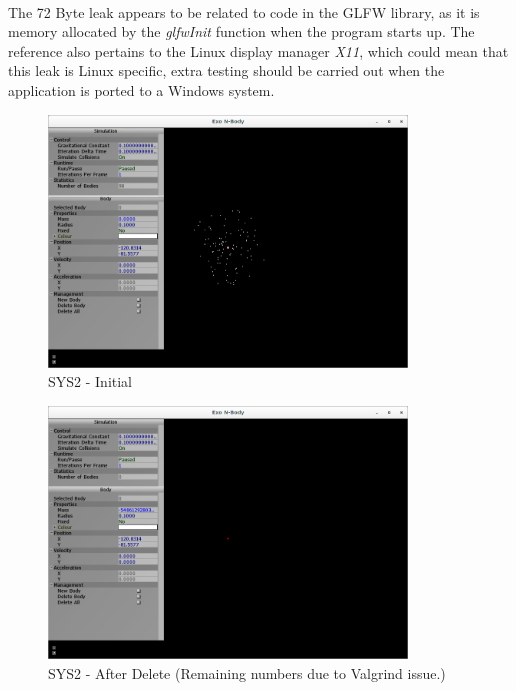 \paragraph{}
The 72 Byte leak appears to be related to code in the GLFW library, as it is memory allocated by the \textit{glfwInit} function when the program starts up. The reference also pertains to the Linux display manager \textit{X11}, which could mean that this leak is Linux specific, extra testing should be carried out when the application is ported to a Windows system.

\pagebreak





\pagebreak

\begin{figure}[H]
  \centering
  \includegraphics[width=0.85\textwidth]{img/testingEvidence/sys2_0.png}
  \caption{SYS2 - Initial}
\end{figure}

\begin{figure}[H]
  \centering
  \includegraphics[width=0.85\textwidth]{img/testingEvidence/sys2_1.png}
  \caption{SYS2 - After Delete (Remaining numbers due to Valgrind issue.)}
\end{figure}

